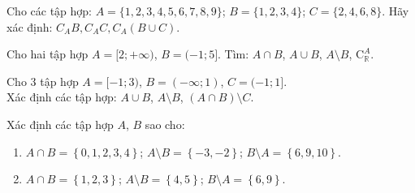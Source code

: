 \begin{bt}%
	Cho các tập hợp: $ A=\{1,2,3,4,5,6,7,8,9\} $; $ B=\{1,2,3,4\} $; $C=\{2,4,6,8\}  $. Hãy xác định: $ C_AB, C_AC, C_A (B \cup C) $.
\end{bt}

\begin{bt}%
	Cho hai tập hợp $A=[2;+\infty)$,  $B=(-1;5]$. Tìm: $A\cap B$, $A\cup B$, $A\setminus B$, $\mathrm{C}_\mathbb{R}^A$.
\end{bt}

\begin{bt}%
	Cho $3$ tập hợp  $A=[-1;3)$, $B=(-\infty;1)$, $C=(-1;1]$.\\
	Xác định các tập hợp: $A\cup B$,  $A\setminus B$, $\left(A\cap B\right)\setminus C$.
	\loigiai{ 
		\begin{itemize}
			 \item $A\cup B=(-\infty;3)$.
			 \item $A\setminus B=[1;3)$.
			\item $\left(A\cap B\right)=[-1;1)\Rightarrow \left(A\cap  B\right)\setminus C=\{-1\}$.
		\end{itemize}
	 }
\end{bt}

\begin{bt}%
	Xác định  các tập hợp $A$, $B$ sao cho:
	\begin{enumerate}
		 \item $A\cap B=\left\{{0,1,2,3,4}\right\}$; $A\setminus B=\left\{{-3,-2}\right\}$; $B\setminus A=\left\{{6,9,10}\right\}$.
		\item $A\cap B=\left\{{1,2,3}\right\}$; $A\setminus B=\left\{{4,5}\right\}$; $B\setminus  A=\left\{{6,9}\right\}$.
	\end{enumerate}
\end{bt}

